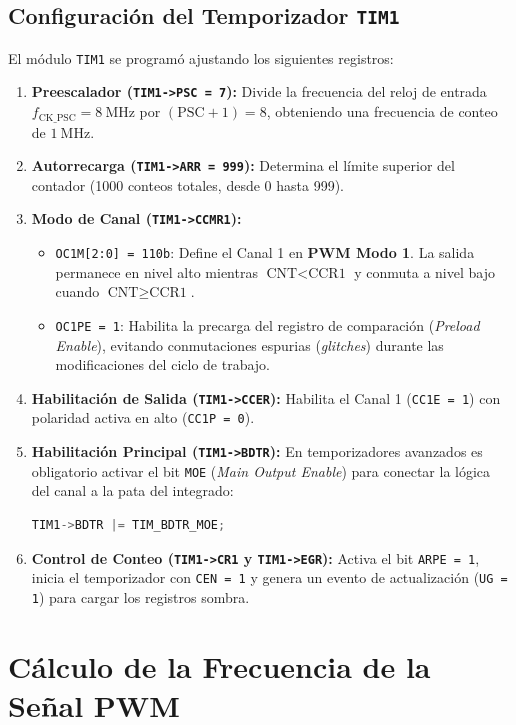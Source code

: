 \subsection{Configuración del Temporizador \texttt{TIM1}}
El módulo \texttt{TIM1} se programó ajustando los siguientes registros:
\begin{enumerate}
    \item \textbf{Preescalador (\lstinline{TIM1->PSC = 7}):} Divide la frecuencia del reloj de entrada
    $f_{\mathrm{CK\_PSC}} = \qty{8}{\MHz}$ por $(\text{PSC} + 1) = 8$, obteniendo una frecuencia de conteo de $\qty{1}{\MHz}$.
    \item \textbf{Autorrecarga (\lstinline{TIM1->ARR = 999}):} Determina el límite superior del contador (1000 conteos
    totales, desde 0 hasta 999).
    \item \textbf{Modo de Canal (\lstinline{TIM1->CCMR1}):}
    \begin{itemize}
        \item \lstinline{OC1M[2:0] = 110b}: Define el Canal 1 en \textbf{PWM Modo 1}. La salida permanece en nivel alto
        mientras $\text{CNT} < \text{CCR1}$ y conmuta a nivel bajo cuando $\text{CNT} \ge \text{CCR1}$.
        \item \lstinline{OC1PE = 1}: Habilita la precarga del registro de comparación (\textit{Preload Enable}), evitando
        conmutaciones espurias (\textit{glitches}) durante las modificaciones del ciclo de trabajo.
    \end{itemize}
    \item \textbf{Habilitación de Salida (\lstinline{TIM1->CCER}):} Habilita el Canal 1 (\lstinline{CC1E = 1}) con
    polaridad activa en alto (\lstinline{CC1P = 0}).
    \item \textbf{Habilitación Principal (\lstinline{TIM1->BDTR}):} En temporizadores avanzados es obligatorio activar
    el bit \lstinline{MOE} (\textit{Main Output Enable}) para conectar la lógica del canal a la pata del integrado:
\begin{lstlisting}[language=C]
TIM1->BDTR |= TIM_BDTR_MOE;
\end{lstlisting}
    \item \textbf{Control de Conteo (\lstinline{TIM1->CR1} y \lstinline{TIM1->EGR}):} Activa el bit \lstinline{ARPE = 1},
    inicia el temporizador con \lstinline{CEN = 1} y genera un evento de actualización (\lstinline{UG = 1}) para cargar
    los registros sombra.
\end{enumerate}

\section{Cálculo de la Frecuencia de la Señal PWM}
\label{sec.ej5:calculo_frecuencia}

